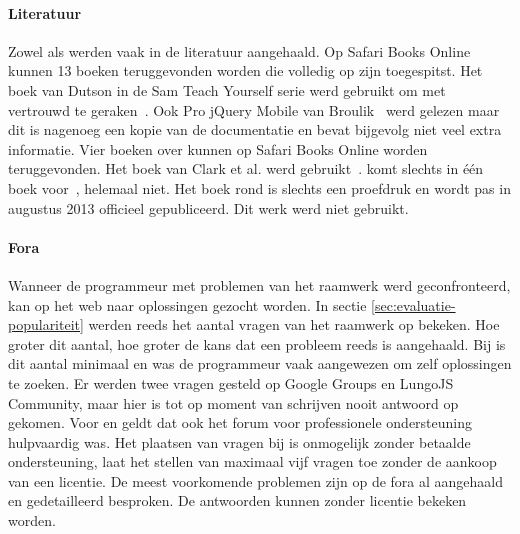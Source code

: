 \paragraph{Literatuur}
Zowel \jqm{} als \st{} werden vaak in de literatuur aangehaald.
Op Safari Books Online kunnen 13 boeken teruggevonden worden die volledig op \jqm{} zijn toegespitst.
Het boek van Dutson in de Sam Teach Yourself serie werd gebruikt om met \jqm{} vertrouwd te geraken~\cite{PhilDutson2012}.
Ook Pro jQuery Mobile van Broulik~\cite{Broulik2012} werd gelezen maar dit is nagenoeg een kopie van de documentatie en bevat bijgevolg niet veel extra informatie.
Vier boeken over \st{} kunnen op Safari Books Online worden teruggevonden.
Het boek van Clark et al. werd gebruikt~\cite{JohnEClark2012}.
\kendo{} komt slechts in één boek voor~\cite{Bhandari2013},  \lungo{} helemaal niet.
Het boek rond \kendo{} is slechts een proefdruk en wordt pas in augustus 2013 officieel gepubliceerd.
Dit werk werd niet gebruikt.


\paragraph{Fora}
Wanneer de programmeur met problemen van het raamwerk werd geconfronteerd, kan op het web naar oplossingen gezocht worden.
In sectie \ref{sec:evaluatie-populariteit} werden reeds het aantal vragen van het raamwerk op \so{} bekeken.
Hoe groter dit aantal,  hoe groter de kans dat een probleem reeds is aangehaald.
Bij \lungo{} is dit aantal minimaal en was de programmeur vaak aangewezen om zelf oplossingen te zoeken.
Er werden twee vragen gesteld op Google Groups en LungoJS Community, maar hier is tot op moment van schrijven nooit antwoord op gekomen.
Voor \st{} en \kendo{} geldt dat ook het forum voor professionele ondersteuning hulpvaardig was.
Het plaatsen van vragen bij \st{} is onmogelijk zonder betaalde ondersteuning,  \kendo{} laat het stellen van maximaal vijf vragen toe zonder de aankoop van een licentie.
De meest voorkomende problemen zijn op de fora al aangehaald en gedetailleerd besproken.
De antwoorden kunnen zonder licentie bekeken worden.